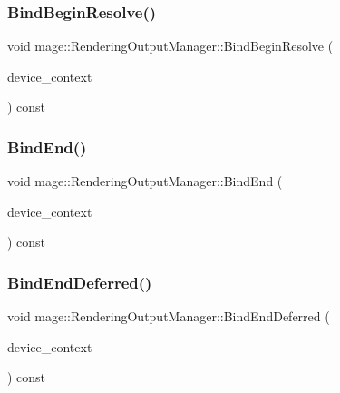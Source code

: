 \hypertarget{classmage_1_1_rendering_output_manager_a68c24a526a6a7dba7875f66152b73b3f}{}\label{classmage_1_1_rendering_output_manager_a68c24a526a6a7dba7875f66152b73b3f} 
\subsubsection{\texorpdfstring{Bind\+Begin\+Resolve()}{BindBeginResolve()}}
{\footnotesize\ttfamily void mage\+::\+Rendering\+Output\+Manager\+::\+Bind\+Begin\+Resolve (\begin{DoxyParamCaption}\item[{I\+D3\+D11\+Device\+Context4 $\ast$}]{device\+\_\+context }\end{DoxyParamCaption}) const\hspace{0.3cm}{\ttfamily [noexcept]}}

\hypertarget{classmage_1_1_rendering_output_manager_a212a0ec7330f52dbe30f87bebccb0c8e}{}\label{classmage_1_1_rendering_output_manager_a212a0ec7330f52dbe30f87bebccb0c8e} 
\subsubsection{\texorpdfstring{Bind\+End()}{BindEnd()}}
{\footnotesize\ttfamily void mage\+::\+Rendering\+Output\+Manager\+::\+Bind\+End (\begin{DoxyParamCaption}\item[{I\+D3\+D11\+Device\+Context4 $\ast$}]{device\+\_\+context }\end{DoxyParamCaption}) const\hspace{0.3cm}{\ttfamily [noexcept]}}

\hypertarget{classmage_1_1_rendering_output_manager_a18bd478dd015a66f4874116f243da37a}{}\label{classmage_1_1_rendering_output_manager_a18bd478dd015a66f4874116f243da37a} 
\subsubsection{\texorpdfstring{Bind\+End\+Deferred()}{BindEndDeferred()}}
{\footnotesize\ttfamily void mage\+::\+Rendering\+Output\+Manager\+::\+Bind\+End\+Deferred (\begin{DoxyParamCaption}\item[{I\+D3\+D11\+Device\+Context4 $\ast$}]{device\+\_\+context }\end{DoxyParamCaption}) const\hspace{0.3cm}{\ttfamily [noexcept]}}


